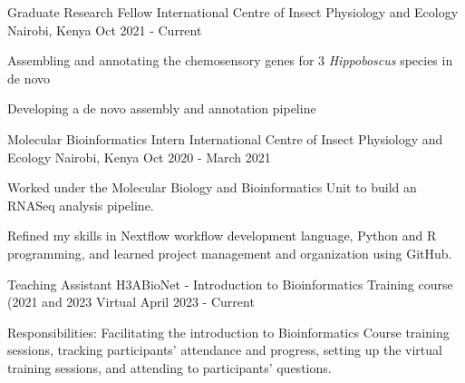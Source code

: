 

\begin{cventries}
\cventry
    {Graduate Research Fellow} %
    {International Centre of Insect Physiology and Ecology} %
    {Nairobi, Kenya} %
    {Oct 2021 - Current} %
    {
      \begin{cvitems} %
        \item Assembling and annotating the chemosensory genes for 3 \textit{Hippoboscus} species in de novo
        \item Developing a de novo assembly and annotation pipeline
      \end{cvitems}
    }

  \cventry
    {Molecular Bioinformatics Intern} %
    {International Centre of Insect Physiology and Ecology} %
    {Nairobi, Kenya} %
    {Oct 2020 - March 2021} %
    {
      \begin{cvitems} %
        \item Worked under the Molecular Biology and Bioinformatics Unit to build an RNASeq analysis pipeline.
        \item Refined my skills in Nextflow workflow development language, Python and R programming, and learned project management and organization using GitHub.
      \end{cvitems}
    }
  \cventry
    {Teaching Assistant} %
    {H3ABioNet - Introduction to Bioinformatics Training  course (2021 and 2023} %
    {Virtual} %
    {April 2023 - Current} %
    {
      \begin{cvitems} %
        \item Responsibilities: Facilitating the introduction to Bioinformatics Course training sessions, tracking participants' attendance and progress, setting up the virtual training sessions, and attending to participants' questions.
      \end{cvitems}
    }


\end{cventries}
